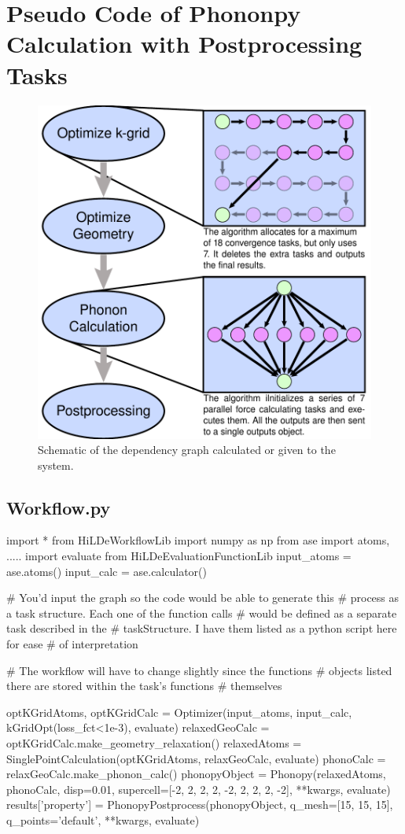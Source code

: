 \documentclass [notitlepage, 12pt, a4paper]{article}
\begin{document}
\section{Pseudo Code of Phononpy Calculation with Postprocessing Tasks}
\begin{figure}
\includegraphics{PhonnWorkflowDiagram.pdf}
\caption{Schematic of the dependency graph calculated or given to the system.}
\label{fig:depGraph}
\end{figure}
\subsection{Workflow.py}
\begin{python}
import * from HiLDeWorkflowLib
import numpy as np
from ase import atoms, .....
import evaluate from HiLDeEvaluationFunctionLib
input_atoms = ase.atoms()
input_calc  = ase.calculator()

# You'd input the graph so the code would be able to generate this
# process as a task structure. Each one of the function calls
# would be defined as a separate task described in the
# taskStructure. I have them listed as a python script here for ease
# of interpretation

# The workflow will have to change slightly since the functions
# objects listed there are stored within the task's functions
# themselves

optKGridAtoms, optKGridCalc = Optimizer(input_atoms, input_calc,
                              kGridOpt(loss_fct<1e-3), evaluate)
relaxedGeoCalc = optKGridCalc.make_geometry_relaxation()
relaxedAtoms = SinglePointCalculation(optKGridAtoms, relaxGeoCalc,
               evaluate)
phonoCalc = relaxGeoCalc.make_phonon_calc()
phonopyObject = Phonopy(relaxedAtoms, phonoCalc, {disp=0.01,
                supercell=[-2, 2, 2, 2, -2, 2, 2, 2, -2], **kwargs},
                evaluate)
results['property'] = PhonopyPostprocess(phonopyObject,
                      {q_mesh=[15, 15, 15], q_points='default',
                      **kwargs}, evaluate)
\end{python}
\newpage
\end{document}

